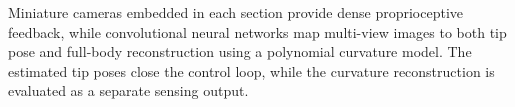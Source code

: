 Miniature cameras embedded in each section provide dense proprioceptive feedback, while convolutional neural networks map multi-view images to both tip pose and full-body reconstruction using a polynomial curvature model. The estimated tip poses close the control loop, while the curvature reconstruction is evaluated as a separate sensing output.
